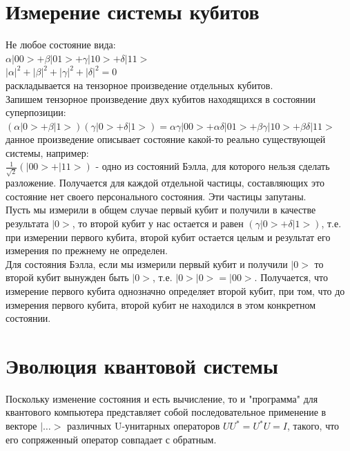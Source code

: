\documentclass[11pt]{report}
\begin{document}
\section{Измерение системы кубитов}
Не любое состояние вида: \\

$\alpha|00>+\beta|01>+\gamma|10>+\delta|11>$\\

$|\alpha|^2 + |\beta|^2 + |\gamma|^2 + |\delta|^2 = 0$ \\

раскладывается на тензорное произведение отдельных кубитов.\\

Запишем тензорное произведение двух кубитов находящихся в состоянии суперпозиции: \\

$(\alpha|0>+\beta|1>)(\gamma|0>+\delta|1>) = \alpha \gamma |00> + \alpha \delta |01> +\beta \gamma |10> +\beta \delta |11>$ \\

данное произведение описывает состояние какой-то реально существующей системы, например: \\

$\frac{1}{\sqrt2}(|00>+|11>)$ - одно из состояний Бэлла, для которого нельзя сделать разложение. Получается для каждой отдельной частицы, составляющих это состояние нет своего персонального состояния. Эти частицы запутаны.\\

Пусть мы измерили в общем случае первый кубит и получили в качестве результата $|0>$, то второй кубит у нас остается и равен $(\gamma|0>+\delta|1>)$, т.е. при измерении первого кубита, второй кубит остается целым и результат его измерения по прежнему не определен. \\

Для состояния Бэлла, если мы измерили первый кубит и получили $|0>$ то второй кубит вынужден быть $|0>$, т.е. $|0>|0>=|00> $. Получается, что измерение первого кубита однозначно определяет второй кубит, при том, что до измерения первого кубита, второй кубит не находился в этом конкретном состоянии.\\

\section{Эволюция квантовой системы}
Поскольку изменение состояния и есть вычисление, то и "программа" для квантового компьютера представляет собой последовательное применение в векторе $|\dots>$ различных U-унитарных операторов 
$UU^{*}=U^{*}U=I$, такого, что его сопряженный оператор совпадает с обратным.
\end{document}
